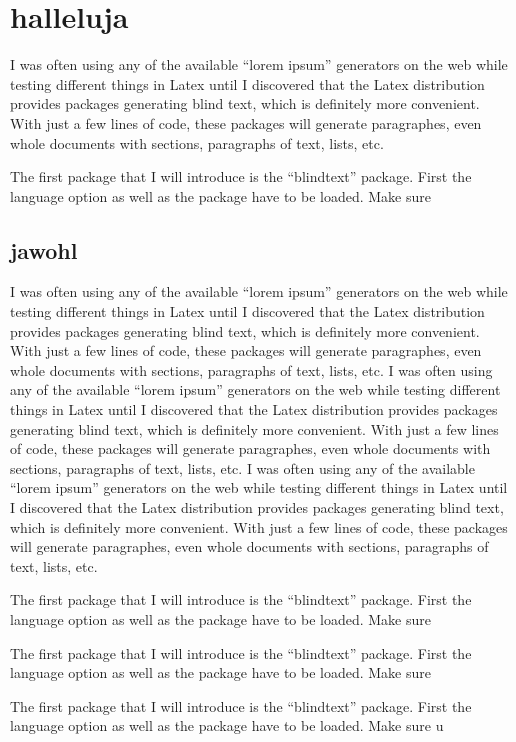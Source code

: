 \section{halleluja}
I was often using any of the available “lorem ipsum” generators on the web while testing different things in Latex until I discovered that the Latex distribution provides packages generating blind text, which is definitely more convenient. With just a few lines of code, these packages will generate paragraphes, even whole documents with sections, paragraphs of text, lists, etc.

The first package that I will introduce is the “blindtext” package. First the language option as well as the package have to be loaded. Make sure

\subsection{jawohl}
I was often using any of the available “lorem ipsum” generators on the web while testing different things in Latex until I discovered that the Latex distribution provides packages generating blind text, which is definitely more convenient. With just a few lines of code, these packages will generate paragraphes, even whole documents with sections, paragraphs of text, lists, etc.
I was often using any of the available “lorem ipsum” generators on the web while testing different things in Latex until I discovered that the Latex distribution provides packages generating blind text, which is definitely more convenient. With just a few lines of code, these packages will generate paragraphes, even whole documents with sections, paragraphs of text, lists, etc.
I was often using any of the available “lorem ipsum” generators on the web while testing different things in Latex until I discovered that the Latex distribution provides packages generating blind text, which is definitely more convenient. With just a few lines of code, these packages will generate paragraphes, even whole documents with sections, paragraphs of text, lists, etc.

The first package that I will introduce is the “blindtext” package. First the language option as well as the package have to be loaded. Make sure

The first package that I will introduce is the “blindtext” package. First the language option as well as the package have to be loaded. Make sure

The first package that I will introduce is the “blindtext” package. First the language option as well as the package have to be loaded. Make sure
u
